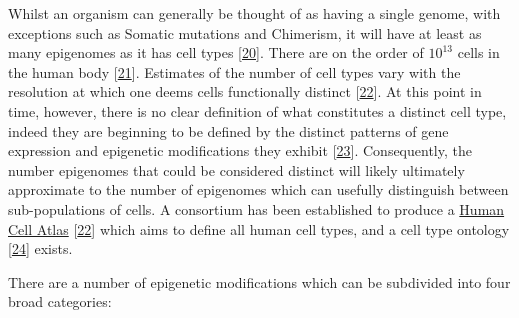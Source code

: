 \documentclass[
]{book}
\begin{document}
Whilst an organism can generally be thought of as having a single genome, with exceptions such as Somatic mutations and Chimerism, it will have at least as many epigenomes as it has cell types {[}\protect\hyperlink{ref-Tabansky2015}{20}{]}.
There are on the order of \(10^{13}\) cells in the human body {[}\protect\hyperlink{ref-Bianconi2013}{21}{]}.
Estimates of the number of cell types vary with the resolution at which one deems cells functionally distinct {[}\protect\hyperlink{ref-Regev2017}{22}{]}.
At this point in time, however, there is no clear definition of what constitutes a distinct cell type, indeed they are beginning to be defined by the distinct patterns of gene expression and epigenetic modifications they exhibit {[}\protect\hyperlink{ref-CellSystemsCellType2017}{23}{]}.
Consequently, the number epigenomes that could be considered distinct will likely ultimately approximate to the number of epigenomes which can usefully distinguish between sub-populations of cells.
A consortium has been established to produce a \href{www.humancellatlas.org}{Human Cell Atlas} {[}\protect\hyperlink{ref-Regev2017}{22}{]} which aims to define all human cell types, and a cell type ontology {[}\protect\hyperlink{ref-CellOntologyOBO}{24}{]} exists.

There are a number of epigenetic modifications which can be subdivided into four broad categories:
\end{document}

